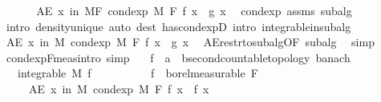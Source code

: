 \begin{isabellebody}
\ \ \isacommand{{\isacharbraceright}{\kern0pt}}\isamarkupfalse%
\isanewline
\ \ \isamarkupfalse%
\ {\isachardoublequoteopen}AE\ x\ in\ {\isacharquery}{\kern0pt}MF{\isachardot}{\kern0pt}\ cond{\isacharunderscore}{\kern0pt}exp\ M\ F\ f\ x\ {\isacharequal}{\kern0pt}\ g\ x{\isachardoublequoteclose}\ \isamarkupfalse%
\ cond{\isacharunderscore}{\kern0pt}exp\ assms\ subalg\ \isamarkupfalse%
\ {\isacharparenleft}{\kern0pt}intro\ density{\isacharunderscore}{\kern0pt}unique{\isacharcomma}{\kern0pt}\ auto\ dest{\isacharcolon}{\kern0pt}\ has{\isacharunderscore}{\kern0pt}cond{\isacharunderscore}{\kern0pt}expD\ intro{\isacharbang}{\kern0pt}{\isacharcolon}{\kern0pt}\ integrable{\isacharunderscore}{\kern0pt}in{\isacharunderscore}{\kern0pt}subalg{\isacharparenright}{\kern0pt}\isanewline
\ \ \isamarkupfalse%
\ \isamarkupfalse%
\ {\isachardoublequoteopen}AE\ x\ in\ M{\isachardot}{\kern0pt}\ cond{\isacharunderscore}{\kern0pt}exp\ M\ F\ f\ x\ {\isacharequal}{\kern0pt}\ g\ x{\isachardoublequoteclose}\ \isamarkupfalse%
\ AE{\isacharunderscore}{\kern0pt}restr{\isacharunderscore}{\kern0pt}to{\isacharunderscore}{\kern0pt}subalg{\isacharbrackleft}{\kern0pt}OF\ subalg{\isacharbrackright}{\kern0pt}\ \isamarkupfalse%
\ simp\isanewline
{}\isamarkupfalse%
%
\endisatagproof
{\isafoldproof}%
%
\isadelimproof
\isanewline
%
\endisadelimproof
\isanewline
{}\isamarkupfalse%
\ cond{\isacharunderscore}{\kern0pt}exp{\isacharunderscore}{\kern0pt}F{\isacharunderscore}{\kern0pt}meas{\isacharbrackleft}{\kern0pt}intro{\isacharcomma}{\kern0pt}\ simp{\isacharbrackright}{\kern0pt}{\isacharcolon}{\kern0pt}\isanewline
\ \ \ f\ {\isacharcolon}{\kern0pt}{\isacharcolon}{\kern0pt}\ {\isachardoublequoteopen}{\isacharprime}{\kern0pt}a\ {\isasymRightarrow}\ {\isacharprime}{\kern0pt}b{\isacharcolon}{\kern0pt}{\isacharcolon}{\kern0pt}{\isacharbraceleft}{\kern0pt}second{\isacharunderscore}{\kern0pt}countable{\isacharunderscore}{\kern0pt}topology{\isacharcomma}{\kern0pt}\ banach{\isacharbraceright}{\kern0pt}{\isachardoublequoteclose}\isanewline
\ \ \ {\isachardoublequoteopen}integrable\ M\ f{\isachardoublequoteclose}\isanewline
\ \ \ \ \ \ \ \ \ \ {\isachardoublequoteopen}f\ {\isasymin}\ borel{\isacharunderscore}{\kern0pt}measurable\ F{\isachardoublequoteclose}\isanewline
\ \ \ \ \ {\isachardoublequoteopen}AE\ x\ in\ M{\isachardot}{\kern0pt}\ cond{\isacharunderscore}{\kern0pt}exp\ M\ F\ f\ x\ {\isacharequal}{\kern0pt}\ f\ x{\isachardoublequoteclose}\isanewline

\end{isabellebody}
